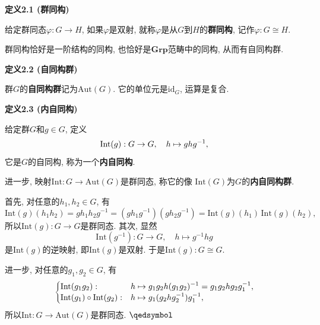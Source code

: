\documentclass[UTF8]{ctexart}
\begin{document}
\hypertarget{sec:定义2.1}{}
\noindent\textbf{定义2.1 (群同构)}

给定群同态$\varphi:G\to H$, 如果$\varphi$是双射,
就称$\varphi$是从$G$到$H$的\textbf{群同构}, 记作$\varphi:G\cong H$.

\vspace{10pt}

群同构恰好是一阶结构的同构, 也恰好是$\mathbf{Grp}$范畴中的同构,
从而有自同构群.

\vspace{10pt}

\hypertarget{sec:定义2.2}{}
\noindent\textbf{定义2.2 (自同构群)}

群$G$的\textbf{自同构群}记为$\mathrm{Aut}(G)$.
它的单位元是$\mathrm{id}_G$, 运算是复合.

\vspace{10pt}

\hypertarget{sec:定义2.3}{}
\noindent\textbf{定义2.3 (内自同构)}

给定群$G$和$g\in G$, 定义
\vspace{-3pt}
\[
    \mathrm{Int}(g):G\to G,\quad h\mapsto ghg^{-1},\\[-3pt]
\]
它是$G$的自同构, 称为一个\textbf{内自同构}.

进一步, 映射$\mathrm{Int}:G\to\mathrm{Aut}(G)$是群同态, 称它的像
$\mathrm{Int}(G)$为$G$的\textbf{内自同构群}.


首先, 对任意的$h_1,h_2\in G$, 有
\[
    \mathrm{Int}(g)(h_1h_2)=gh_1h_2g^{-1}=(gh_1g^{-1})(gh_2g^{-1})
    =\mathrm{Int}(g)(h_1)\,\mathrm{Int}(g)(h_2),
\]
所以$\mathrm{Int}(g):G\to G$是群同态. 其次, 显然
\[
    \mathrm{Int}(g^{-1}):G\to G,\quad h\mapsto g^{-1}hg
\]
是$\mathrm{Int}(g)$的逆映射, 即$\mathrm{Int}(g)$是双射.
于是$\mathrm{Int}(g):G\cong G$.

进一步, 对任意的$g_1,g_2\in G$, 有
\vspace{3pt}
\[\left\{\begin{aligned}
    &\mathrm{Int}(g_1g_2):&&h\mapsto
    g_1g_2h(g_1g_2)^{-1}=g_1g_2hg_2g_1^{-1},\\[-3pt]
    &\mathrm{Int}(g_1)\circ\mathrm{Int}(g_2):&&h\mapsto
    g_1(g_2hg_2^{-1})g_1^{-1},
\end{aligned}\right.\\[3pt]\]
所以$\mathrm{Int}:G\to\mathrm{Aut}(G)$是群同态. \hfill $\qedsymbol$
\end{document}
